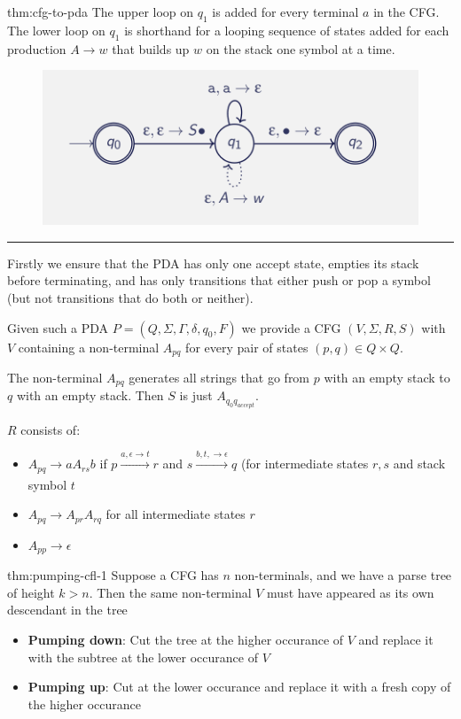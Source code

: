 \documentclass[landscape, 8pt]{extarticle}
\begin{document}
\begin{multicols}{3}
\begin{thm}{thm:cfg-to-pda}{}
The upper loop on $q_1$ is added for every terminal $a$ in the CFG. The lower loop on $q_1$ is shorthand for a looping sequence of states added for each production $A \to w$ that builds up $w$ on the stack one symbol at a time.

\begin{figure}[H]
    \centering
    \includegraphics[width=0.75\linewidth]{images/cfg-to-pda.png}
\end{figure}
\noindent\rule{\textwidth}{0.2pt}

Firstly we ensure that the PDA has only one accept state, empties its stack before terminating, and has only transitions that either push or pop a symbol (but not transitions that do both or neither).

Given such a PDA $P=(Q, \Sigma, \Gamma, \delta, q_0, F)$ we provide a CFG $(V, \Sigma, R, S)$ with $V$ containing a non-terminal $A_{pq}$ for every pair of states $(p,q) \in Q \times Q$.

The non-terminal $A_{pq}$ generates all strings that go from $p$ with an empty stack to $q$ with an empty stack. Then $S$ is just $A_{q_0q_{accept}}$.

$R$ consists of:
\begin{itemize}
    \item $A_{pq} \to aA_{rs}b$ if $p \xrightarrow[]{a,\epsilon \to t}r$ and $s \xrightarrow[]{b, t, \to \epsilon}q$ (for intermediate states $r, s$ and stack symbol $t$
    \item $A_{pq} \to A_{pr}A_{rq}$ for all intermediate states $r$
    \item $A_{pp} \to \epsilon$
\end{itemize}
\end{thm}

\begin{thm}{thm:pumping-cfl-1}{}
Suppose a CFG has $n$ non-terminals, and we have a parse tree of height $k>n$. Then the same non-terminal $V$ must have appeared as its own descendant in the tree
\renewcommand\labelitemi{\tiny$\bullet$}
\begin{itemize}
    \setlength\itemsep{0em}
    \item \textbf{Pumping down}: Cut the tree at the higher occurance of $V$ and replace it with the subtree at the lower occurance of $V$
    \item \textbf{Pumping up}: Cut at the lower occurance and replace it with a fresh copy of the higher occurance
\end{itemize}
\end{thm}


\end{multicols}
\end{document}
